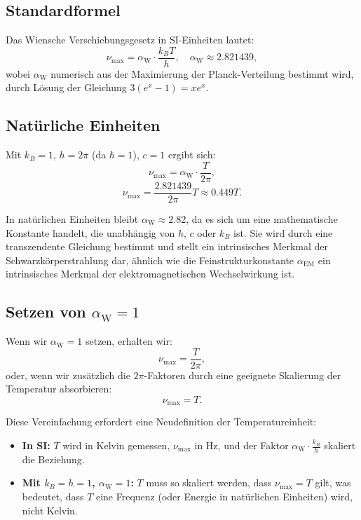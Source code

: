 \documentclass[12pt,a4paper]{article}
\newcommand{\alphaEM}{\alpha_{\text{EM}}}
\newcommand{\alphaW}{\alpha_{\text{W}}}
\begin{document}
	\subsection{Standardformel}
	
	Das Wiensche Verschiebungsgesetz in SI-Einheiten lautet:
	\[
	\nu_{\text{max}} = \alphaW \cdot \frac{k_B T}{h}, \quad \alphaW \approx 2.821439,
	\]
	wobei \(\alphaW\) numerisch aus der Maximierung der Planck-Verteilung bestimmt wird, durch Lösung der Gleichung \(3 (e^x - 1) = x e^x\).
	
	\subsection{Natürliche Einheiten}
	
	Mit \(k_B = 1\), \(h = 2\pi\) (da \(\hbar = 1\)), \(c = 1\) ergibt sich:
	\[
	\nu_{\text{max}} = \alphaW \cdot \frac{T}{2\pi},
	\]
	\[
	\nu_{\text{max}} = \frac{2.821439}{2\pi} T \approx 0.449 T.
	\]
	
	In natürlichen Einheiten bleibt \(\alphaW \approx 2.82\), da es sich um eine mathematische Konstante handelt, die unabhängig von \(h\), \(c\) oder \(k_B\) ist. Sie wird durch eine transzendente Gleichung bestimmt und stellt ein intrinsisches Merkmal der Schwarzkörperstrahlung dar, ähnlich wie die Feinstrukturkonstante \(\alphaEM\) ein intrinsisches Merkmal der elektromagnetischen Wechselwirkung ist.
	
	\subsection{Setzen von \(\alphaW = 1\)}
	
	Wenn wir \(\alphaW = 1\) setzen, erhalten wir:
	\[
	\nu_{\text{max}} = \frac{T}{2\pi},
	\]
	oder, wenn wir zusätzlich die \(2\pi\)-Faktoren durch eine geeignete Skalierung der Temperatur absorbieren:
	\[
	\nu_{\text{max}} = T.
	\]
	
	Diese Vereinfachung erfordert eine Neudefinition der Temperatureinheit:
	\begin{itemize}
		\item \textbf{In SI:} \(T\) wird in Kelvin gemessen, \(\nu_{\text{max}}\) in Hz, und der Faktor \(\alphaW \cdot \frac{k_B}{h}\) skaliert die Beziehung.
		\item \textbf{Mit \(k_B = h = 1\), \(\alphaW = 1\):} \(T\) muss so skaliert werden, dass \(\nu_{\text{max}} = T\) gilt, was bedeutet, dass \(T\) eine Frequenz (oder Energie in natürlichen Einheiten) wird, nicht Kelvin.
	\end{itemize}
	
\end{document}
